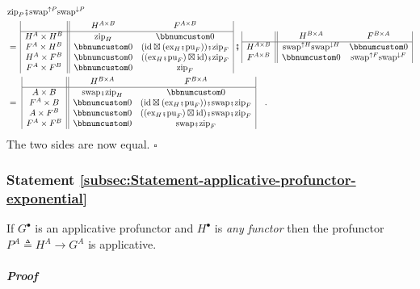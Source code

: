 \begin{align*}
 & \text{zip}_{P}\bef\text{swap}^{\uparrow P}\text{swap}^{\downarrow P}\\
 & =\,\begin{array}{|c||cc|}
 & H^{A\times B} & F^{A\times B}\\
\hline H^{A}\times H^{B} & \text{zip}_{H} & \bbnum 0\\
F^{A}\times H^{B} & \bbnum 0 & (\text{id}\boxtimes(\text{ex}_{H}\bef\text{pu}_{F}))\bef\text{zip}_{F}\\
H^{A}\times F^{B} & \bbnum 0 & ((\text{ex}_{H}\bef\text{pu}_{F})\boxtimes\text{id})\bef\text{zip}_{F}\\
F^{A}\times F^{B} & \bbnum 0 & \text{zip}_{F}
\end{array}\,\bef\,\begin{array}{|c||cc|}
 & H^{B\times A} & F^{B\times A}\\
\hline H^{A\times B} & \text{swap}^{\uparrow H}\text{swap}^{\downarrow H} & \bbnum 0\\
F^{A\times B} & \bbnum 0 & \text{swap}^{\uparrow F}\text{swap}^{\downarrow F}
\end{array}\\
 & =\,\,\begin{array}{|c||cc|}
 & H^{B\times A} & F^{B\times A}\\
\hline A\times B & \text{swap}\bef\text{zip}_{H} & \bbnum 0\\
F^{A}\times B & \bbnum 0 & (\text{id}\boxtimes(\text{ex}_{H}\bef\text{pu}_{F}))\bef\text{swap}\bef\text{zip}_{F}\\
A\times F^{B} & \bbnum 0 & ((\text{ex}_{H}\bef\text{pu}_{F})\boxtimes\text{id})\bef\text{swap}\bef\text{zip}_{F}\\
F^{A}\times F^{B} & \bbnum 0 & \text{swap}\bef\text{zip}_{F}
\end{array}\quad.
\end{align*}
The two sides are now equal. $\square$

\subsubsection{Statement \label{subsec:Statement-applicative-profunctor-exponential}\ref{subsec:Statement-applicative-profunctor-exponential}}

If $G^{\bullet}$ is an applicative profunctor and $H^{\bullet}$
is \emph{any functor} then the profunctor $P^{A}\triangleq H^{A}\rightarrow G^{A}$
is applicative.

\subparagraph{Proof}


